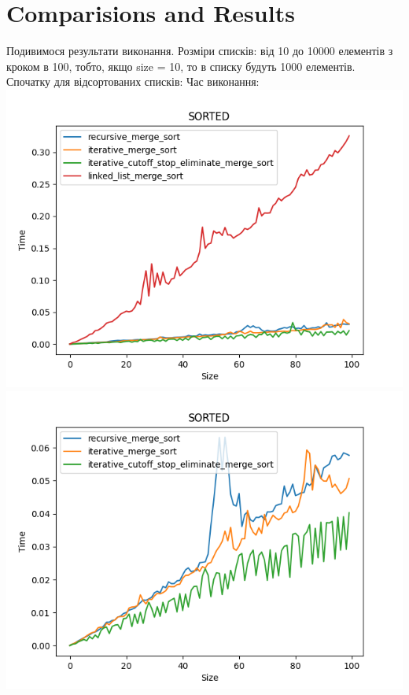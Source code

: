 \documentclass{article}
\begin{document}
    \section{Comparisions and Results}
        \indent Подивимося результати виконання. Розміри списків: від 10 до 10000 елементів з кроком в 100, тобто, якщо size = 10, то в списку будуть 1000 елементів.
        \newline
        \indent \indent Спочатку для відсортованих списків:
        \newpage
        \indent \indent \indent Час виконання:
        \newline
            \includegraphics[scale=0.5]{sorted_Time_4_sorts.png}
            \includegraphics[scale=0.5]{sorted_Time_3_sorts.png}
        \newline
\end{document}
